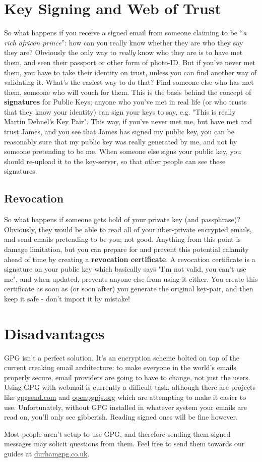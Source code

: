 \section{Key Signing and Web of Trust}

So what happens if you receive a signed email from someone claiming to be ``\textit{a rich african prince}'': how can you really know whether they are who they say they are? Obviously the only way to \textit{really} know who they are is to have met them, and seen their passport or other form of photo-ID. But if you've never met them, you have to take their identity on trust, unless you can find another way of validating it. What's the easiest way to do that? Find someone else who has met them, someone who will vouch for them. This is the basis behind the concept of \textbf{signatures} for Public Keys; anyone who you've met in real life (or who trusts that they know your identity) can sign your keys to say, e.g. "This is really Martin Dehnel's Key Pair". This way, if you've never met me, but have met and trust James, and you see that James has signed my public key, you can be reasonably sure that my public key was really generated by me, and not by someone pretending to be me. When someone else signs your public key, you should re-upload it to the key-server, so that other people can see these signatures.

\subsection{Revocation}
So what happens if someone gets hold of your private key (and passphrase)? Obviously, they would be able to read all of your \"{u}ber-private encrypted emails, and send emails pretending to be you; not good. Anything from this point is damage limitation, but you can prepare for and prevent this potential calamity ahead of time by creating a \textbf{revocation certificate}. A revocation certificate is a signature on your public key which basically says "I'm not valid, you can't use me", and when updated, prevents anyone else from using it either. You create this certificate as soon as (or soon after) you generate the original key-pair, and then keep it safe - don't import it by mistake!


\section{Disadvantages}

GPG isn't a perfect solution. It's an encryption scheme bolted on top of the current creaking email architecture: to make everyone in the world's emails properly secure, email providers are going to have to change, not just the users. Using GPG with webmail is currently a difficult task, although there are projects like \href{http://gpgsend.com/}{gpgsend.com} and \href{http://openpgpjs.org/}{openpgpjs.org} which are attempting to make it easier to use. Unfortunately, without GPG installed in whatever system your emails are read on, you'll only see gibberish. Reading signed ones will be fine however.

Most people aren't setup to use GPG, and therefore sending them signed messages may solicit questions from them. Feel free to send them towards our guides at \href{http://durhamgpg.co.uk}{durhamgpg.co.uk}.

\loggingall

\endinput
